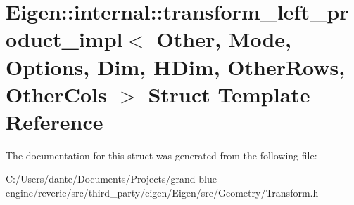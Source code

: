 \hypertarget{struct_eigen_1_1internal_1_1transform__left__product__impl}{}\section{Eigen\+::internal\+::transform\+\_\+left\+\_\+product\+\_\+impl$<$ Other, Mode, Options, Dim, H\+Dim, Other\+Rows, Other\+Cols $>$ Struct Template Reference}
\label{struct_eigen_1_1internal_1_1transform__left__product__impl}


The documentation for this struct was generated from the following file\+:\begin{DoxyCompactItemize}
\item 
C\+:/\+Users/dante/\+Documents/\+Projects/grand-\/blue-\/engine/reverie/src/third\+\_\+party/eigen/\+Eigen/src/\+Geometry/Transform.\+h\end{DoxyCompactItemize}

